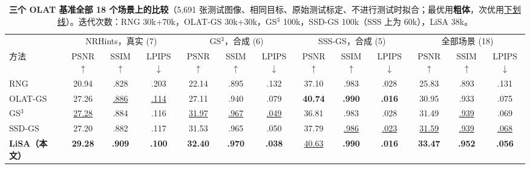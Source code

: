 \begin{table}[t]
\caption{\textbf{三个 OLAT 基准全部 18 个场景上的比较}（5,691 张测试图像、相同目标、原始测试标定、不进行测试时拟合；最优用\textbf{粗体}，次优用\underline{下划线}）。迭代次数：RNG 30k+70k，OLAT-GS 30k+30k，GS$^3$ 100k，SSD-GS 100k（SSS 上为 60k），LiSA 38k。}
\label{tab:main}
\centering\small
\setlength{\tabcolsep}{3.8pt}
\begin{tabular}{@{}l ccc ccc ccc ccc@{}}
\toprule
 & \multicolumn{3}{c}{NRHints，真实 (7)} & \multicolumn{3}{c}{GS$^3$，合成 (6)} & \multicolumn{3}{c}{SSS-GS，合成 (5)} & \multicolumn{3}{c}{全部场景 (18)} \\
\cmidrule(lr){2-4}\cmidrule(lr){5-7}\cmidrule(lr){8-10}\cmidrule(l){11-13}
方法 & PSNR$\uparrow$ & SSIM$\uparrow$ & LPIPS$\downarrow$ & PSNR$\uparrow$ & SSIM$\uparrow$ & LPIPS$\downarrow$ & PSNR$\uparrow$ & SSIM$\uparrow$ & LPIPS$\downarrow$ & PSNR$\uparrow$ & SSIM$\uparrow$ & LPIPS$\downarrow$ \\
\midrule
RNG~\cite{fan2025rng} & 20.94 & .828 & .203 & 22.14 & .895 & .132 & 37.10 & .983 & .028 & 25.83 & .893 & .131 \\
OLAT-GS~\cite{kuang2024olat} & 27.26 & \underline{.886} & \underline{.114} & 27.11 & .940 & .079 & \textbf{40.74} & \textbf{.990} & \textbf{.016} & 30.95 & .933 & .075 \\
GS$^3$~\cite{bi2024gs3} & \underline{27.28} & .884 & .116 & \underline{31.97} & \underline{.967} & \underline{.049} & 36.81 & .983 & .028 & 31.49 & \underline{.939} & .069 \\
SSD-GS~\cite{zheng2026ssdgs} & 27.20 & .882 & .117 & 31.53 & .965 & .050 & 37.79 & \underline{.986} & \underline{.023} & \underline{31.59} & \underline{.939} & \underline{.068} \\
\midrule
\textbf{LiSA（本文）} & \textbf{29.28} & \textbf{.909} & \textbf{.100} & \textbf{32.40} & \textbf{.970} & \textbf{.038} & \underline{40.63} & \textbf{.990} & \textbf{.016} & \textbf{33.47} & \textbf{.952} & \textbf{.056} \\
\bottomrule
\end{tabular}
\end{table}

